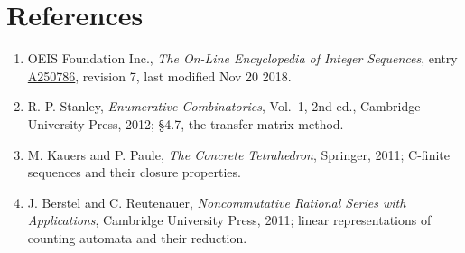 \documentclass[11pt]{article}
\theoremstyle{definition}
\begin{document}
\section{References}

\begin{enumerate}

\item OEIS Foundation Inc., \emph{The On-Line Encyclopedia of Integer Sequences}, entry \href{https://oeis.org/A250786}{A250786}, revision 7, last modified Nov 20 2018.

\item R. P. Stanley, \emph{Enumerative Combinatorics}, Vol.~1, 2nd ed., Cambridge University Press, 2012; \S4.7, the transfer-matrix method.

\item M. Kauers and P. Paule, \emph{The Concrete Tetrahedron}, Springer, 2011; C-finite sequences and their closure properties.

\item J. Berstel and C. Reutenauer, \emph{Noncommutative Rational Series with Applications}, Cambridge University Press, 2011; linear representations of counting automata and their reduction.

\end{enumerate}
\end{document}
